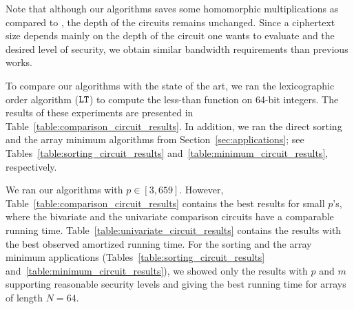 Note that although our algorithms saves some homomorphic multiplications as compared to \cite{TLWRK20}, the depth of the circuits remains unchanged. Since a ciphertext size depends mainly on the depth of the circuit one wants to evaluate and the desired level of security, we obtain similar bandwidth requirements than previous works.

To compare our algorithms with the state of the art, we ran the lexicographic order algorithm ($\mathtt{LT}$) to compute the less-than function on 64-bit integers.
The results of these experiments are presented in Table~\ref{table:comparison_circuit_results}.
In addition, we ran the direct sorting and the array minimum algorithms from Section~\ref{sec:applications}; see Tables~\ref{table:sorting_circuit_results} and~\ref{table:minimum_circuit_results}, respectively.

We ran our algorithms with $p \in [3,659]$.
However, Table~\ref{table:comparison_circuit_results} contains the best results for small $p$'s, where the bivariate and the univariate comparison circuits have a comparable running time.
Table~\ref{table:univariate_circuit_results} contains the results with the best observed amortized running time.
For the sorting and the array minimum applications (Tables~\ref{table:sorting_circuit_results} and~\ref{table:minimum_circuit_results}), we showed only the results with $p$ and $m$ supporting reasonable security levels and giving the best running time for arrays of length $N=64$.


